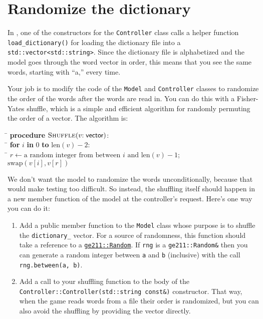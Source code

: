 \documentclass{tufte-handout}
\begin{document}
\section{Randomize the dictionary}

In , one of the constructors for the
\verb^Controller^ class calls a helper function \verb!load_dictionary()!
for loading the dictionary file into a \verb!std::vector<std::string>!.
Since the dictionary file is alphabetized and the model goes through the
word vector in order, this means that you see the same words, starting
with ``a,'' every time.

Your job is to modify the code of the \verb^Model^ and \verb^Controller^
classes to randomize the order of the words after the words are read in.
You can do this with a Fisher-Yates shuffle, which is a simple and
efficient algorithm for randomly permuting the order of a vector. The
algorithm is:

{
\sffamily
\begin{tabbing}
\qquad\=\+
  \textbf{procedure} $\textsc{Shuffle}(v{:}\;\textsf{vector})$: \\
\qquad\=\+
  \textbf{for} $i$ \textbf{in} $0$
        \textbf{to} $\mathrm{len}(v) - 2$: \\
\qquad\=\+
  $r \gets \textrm{a random integer from between $i$ and $\mathrm{len}(v) - 1$}$; \\
  $\mathrm{swap}(v[i], v[r])$
\end{tabbing}
}

We don't want the model to randomize the words unconditionally, because
that would make testing too difficult. So instead, the shuffling itself
should happen in a new member function of the model at the controller's
request. Here's one way you can do it:

\begin{enumerate}

  \item Add a public member function to the \verb^Model^ class whose
    purpose is to shuffle the \verb^dictionary_^ vector. For a source of
    randomness, this function should take a reference to a
    \href{https://tov.github.io/ge211/classge211_1_1_random.html}
    {\texttt{ge211::Random}}. If \verb^rng^ is a \verb^ge211::Random&^
    then you can generate a random integer between \verb^a^ and \verb^b^
    (inclusive) with the call \verb^rng.between(a, b)^.

  \item Add a call to your shuffling function to the body of the
    \texttt{Controller::\-Controller(std::string const\&)} constructor.
    That way, when the game reads words from a file their order is
    randomized, but you can also avoid the shuffling by providing the
    vector directly.

\end{enumerate}
\end{document}
